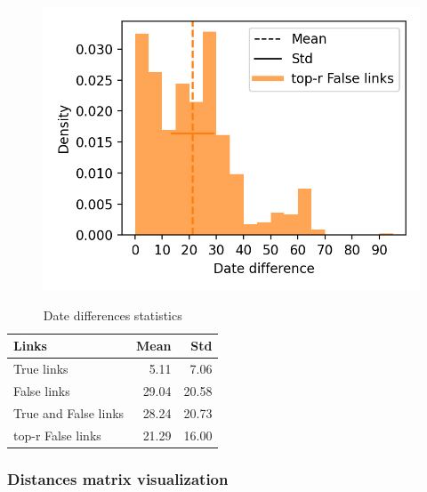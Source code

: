 \begin{figure}
  \label{fig:dates_differences_r_false}
  \includegraphics[width=\linewidth]{img/dates_differences_r_false.png}
\end{figure}

\begin{table}
  \centering
  \caption{Date differences statistics}
  \label{tab:date_differences}
    \begin{tabular}{l r r}
      \toprule
      Links                & Mean  & Std   \\
      \midrule
      True links           &  5.11 &  7.06 \\
      False links          & 29.04 & 20.58 \\
      True and False links & 28.24 & 20.73 \\
      top-r False links    & 21.29 & 16.00 \\
      \bottomrule
    \end{tabular}
\end{table}

\subsubsection{Distances matrix visualization}

